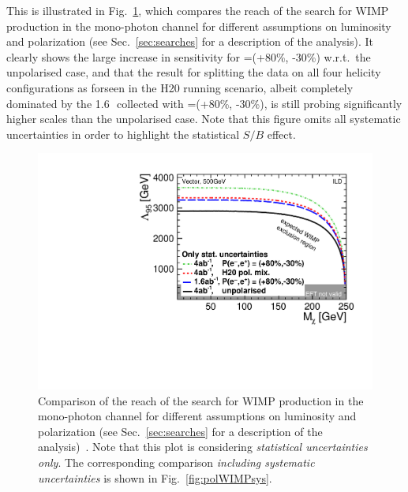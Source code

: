 This is illustrated in Fig.~\ref{fig:polWIMPstat}, which compares the reach of the search for WIMP production in the mono-photon channel for different assumptions on luminosity and polarization (see Sec.~\ref{sec:searches} for a description of the analysis). It clearly shows the large increase in sensitivity for \Pmp=(+80\%, -30\%) w.r.t.\ the unpolarised case, and that the result for splitting the data on all four helicity configurations as forseen in the H20 running scenario, albeit completely dominated by the 1.6\,\iab\ collected with \Pmp=(+80\%, -30\%), is still probing significantly higher scales than the unpolarised case. Note that this figure omits all systematic uncertainties in order to highlight the statistical $S/B$ effect. 
\begin{figure}
\centering
\includegraphics[width=0.95\linewidth]{./chapters/figures/vector_noSystematics.pdf}
		
\caption{Comparison of the reach of the search for WIMP production in the mono-photon channel for different assumptions on luminosity and polarization (see Sec.~\ref{sec:searches} for a description of the analysis)~\cite{Habermehl:417605}. Note that this plot is considering {\em statistical uncertainties only}. The corresponding comparison {\em including systematic uncertainties} is shown in Fig.~\ref{fig:polWIMPsys}.}
\label{fig:polWIMPstat}
\end{figure}


